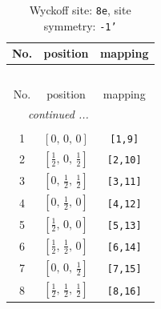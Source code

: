 \documentclass[fleqn,8pt]{jsarticle}
\begin{document}
\renewcommand{\arraystretch}{1.2}
\begin{longtable}{ccc}
\caption{Wyckoff site: {\tt 8e}, site symmetry: {\tt -1'}}
 \\
 \hline \hline
No. & position & mapping \\ \hline \endfirsthead

\multicolumn{2}{l}{\tablename\ \thetable{}} \\
 \hline \hline
No. & position & mapping \\ \hline \endhead

 \hline \hline
\multicolumn{2}{r}{\footnotesize\it continued ...} \\ \endfoot

 \hline \hline
\multicolumn{2}{r}{} \\ \endlastfoot

1 & $\left[ 0,\, 0,\, 0 \right]$ & {\tt [1,9]} \\ \hline
2 & $\left[ \frac{1}{2},\, 0,\, \frac{1}{2} \right]$ & {\tt [2,10]} \\ \hline
3 & $\left[ 0,\, \frac{1}{2},\, \frac{1}{2} \right]$ & {\tt [3,11]} \\ \hline
4 & $\left[ 0,\, \frac{1}{2},\, 0 \right]$ & {\tt [4,12]} \\ \hline
5 & $\left[ \frac{1}{2},\, 0,\, 0 \right]$ & {\tt [5,13]} \\ \hline
6 & $\left[ \frac{1}{2},\, \frac{1}{2},\, 0 \right]$ & {\tt [6,14]} \\ \hline
7 & $\left[ 0,\, 0,\, \frac{1}{2} \right]$ & {\tt [7,15]} \\ \hline
8 & $\left[ \frac{1}{2},\, \frac{1}{2},\, \frac{1}{2} \right]$ & {\tt [8,16]} \\
\end{longtable}
\renewcommand{\arraystretch}{1.2}
\end{document}
